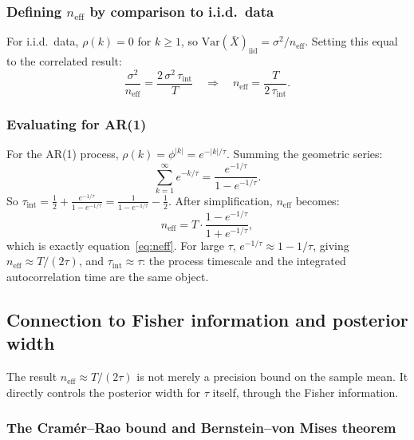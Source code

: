 \documentclass[11pt, a4paper]{article}
\begin{document}
\subsubsection*{Defining $n_\mathrm{eff}$ by comparison to i.i.d.\ data}

For i.i.d.\ data, $\rho(k) = 0$ for $k \geq 1$, so
$\mathrm{Var}(\bar{X})_\mathrm{iid} = \sigma^2 / n_\mathrm{eff}$.
Setting this equal to the correlated result:
\begin{equation}
    \frac{\sigma^2}{n_\mathrm{eff}} = \frac{2\,\sigma^2\,\tau_\mathrm{int}}{T}
    \quad\Longrightarrow\quad
    \boxed{n_\mathrm{eff} = \frac{T}{2\,\tau_\mathrm{int}}}.
    \label{eq:neff_tauint}
\end{equation}

\subsubsection*{Evaluating for AR(1)}

For the AR(1) process, $\rho(k) = \phi^{|k|} = e^{-|k|/\tau}$.
Summing the geometric series:
\begin{equation}
    \sum_{k=1}^{\infty} e^{-k/\tau}
    = \frac{e^{-1/\tau}}{1 - e^{-1/\tau}}.
\end{equation}
So $\tau_\mathrm{int} = \frac{1}{2} + \frac{e^{-1/\tau}}{1-e^{-1/\tau}}
= \frac{1}{1 - e^{-1/\tau}} - \frac{1}{2}$.
After simplification, $n_\mathrm{eff}$ becomes:
\begin{equation}
    n_\mathrm{eff} = T \cdot \frac{1 - e^{-1/\tau}}{1 + e^{-1/\tau}},
\end{equation}
which is exactly equation~\eqref{eq:neff}.
For large $\tau$, $e^{-1/\tau} \approx 1 - 1/\tau$, giving
$n_\mathrm{eff} \approx T/(2\tau)$,
and $\tau_\mathrm{int} \approx \tau$: the process timescale and the integrated
autocorrelation time are the same object.

\subsection{Connection to Fisher information and posterior width}
\label{subsec:neff_fisher}

The result $n_\mathrm{eff} \approx T/(2\tau)$ is not merely a precision bound on
the sample mean.
It directly controls the posterior width for $\tau$ itself, through the Fisher
information.

\subsubsection*{The Cram\'er--Rao bound and Bernstein--von Mises theorem}
\end{document}
